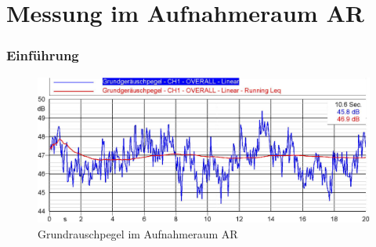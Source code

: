 \documentclass[11pt]{report}
\begin{document}
\section{Messung im Aufnahmeraum AR}
\subsubsection{Einf\"uhrung}
\begin{figure}[htbp]
\begin{center}
\includegraphics[width=14cm,keepaspectratio=true]{Grundrauschpegel}
\caption{Grundrauschpegel im Aufnahmeraum AR}
\label{fig:i2geometrics}
\end{center}
\end{figure}
\end{document}
